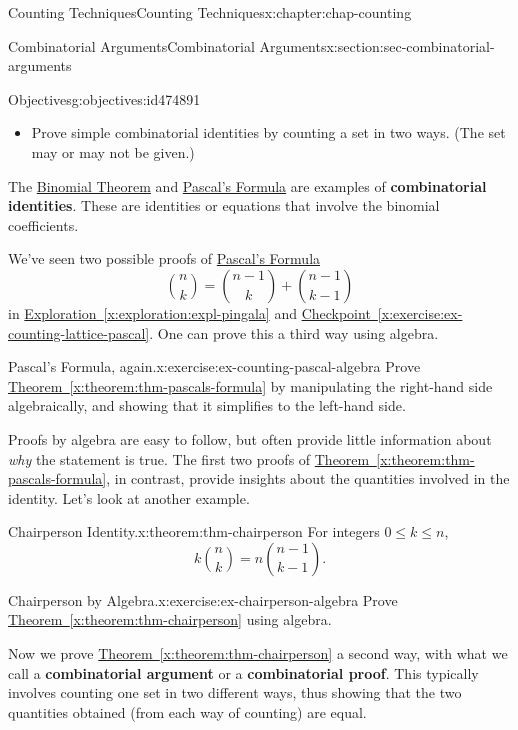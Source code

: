 \documentclass[oneside,10pt,]{book}
\newcommand{\xreffont}{\relax}
\newcommand{\terminology}[1]{\textbf{#1}}
\numberwithin{equation}{section}
\begin{document}
\begin{chapterptx}{Counting Techniques}{}{Counting Techniques}{}{}{x:chapter:chap-counting}
\begin{sectionptx}{Combinatorial Arguments}{}{Combinatorial Arguments}{}{}{x:section:sec-combinatorial-arguments}
\begin{objectives}{Objectives}{g:objectives:id474891}
%
\begin{itemize}[label=\textbullet]
\item{}Prove simple combinatorial identities by counting a set in two ways. (The set may or may not be given.)%
\end{itemize}
\end{objectives}
The \hyperref[x:theorem:thm-binomial]{Binomial Theorem} and \hyperref[x:theorem:thm-pascals-formula]{Pascal's Formula} are examples of \terminology{combinatorial identities}. These are identities or equations that involve the binomial coefficients.%
\par
We've seen two possible proofs of \hyperref[x:theorem:thm-pascals-formula]{Pascal's Formula}%
\begin{equation*}
\binom{n}{k} = \binom{n-1}{k} + \binom{n-1}{k-1}
\end{equation*}
in \hyperref[x:exploration:expl-pingala]{Exploration~{\xreffont\ref{x:exploration:expl-pingala}}} and \hyperref[x:exercise:ex-counting-lattice-pascal]{Checkpoint~{\xreffont\ref{x:exercise:ex-counting-lattice-pascal}}}. One can prove this a third way using algebra.%
\begin{inlineexercise}{Pascal's Formula, again.}{x:exercise:ex-counting-pascal-algebra}%
Prove \hyperref[x:theorem:thm-pascals-formula]{Theorem~{\xreffont\ref{x:theorem:thm-pascals-formula}}} by manipulating the right-hand side algebraically, and showing that it simplifies to the left-hand side.%
\end{inlineexercise}
Proofs by algebra are easy to follow, but often provide little information about \emph{why} the statement is true. The first two proofs of \hyperref[x:theorem:thm-pascals-formula]{Theorem~{\xreffont\ref{x:theorem:thm-pascals-formula}}}, in contrast, provide insights about the quantities involved in the identity. Let's look at another example.%
\begin{theorem}{Chairperson Identity.}{}{x:theorem:thm-chairperson}%
For integers \(0 \leq k \leq n\),%
\begin{equation*}
k\binom{n}{k} = n\binom{n-1}{k-1}\text{.}
\end{equation*}
%
\end{theorem}
\begin{inlineexercise}{Chairperson by Algebra.}{x:exercise:ex-chairperson-algebra}%
Prove \hyperref[x:theorem:thm-chairperson]{Theorem~{\xreffont\ref{x:theorem:thm-chairperson}}} using algebra.%
\end{inlineexercise}
Now we prove \hyperref[x:theorem:thm-chairperson]{Theorem~{\xreffont\ref{x:theorem:thm-chairperson}}} a second way, with what we call a \terminology{combinatorial argument} or a \terminology{combinatorial proof}. This typically involves counting one set in two different ways, thus showing that the two quantities obtained (from each way of counting) are equal.%

\end{sectionptx}
\end{chapterptx}
\end{document}
